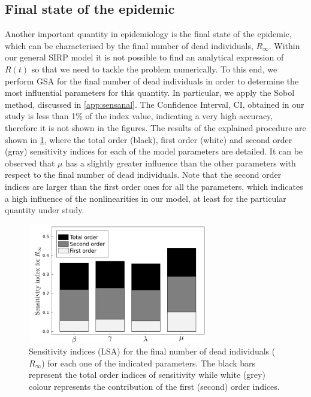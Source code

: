\subsection{Final state of the epidemic}

Another important quantity in epidemiology is the final state of the
epidemic, which can be characterised by the final number of dead individuals,
$R_\infty$. Within our general SIRP model it is not possible to find an
analytical expression of $R(t)$ so that we need to tackle the problem
numerically. To this end, we perform GSA for the final number of dead
individuals in order to determine the most influential parameters for this
quantity. In particular, we apply the Sobol method, discussed in
\cref{app:sensanal}.
The Confidence Interval, CI, obtained in our
study is less than 1\% of the index value, indicating a very high accuracy,
therefore it is not shown in the figures. The results of the explained
procedure are shown in \cref{fig: GSA_R_inf}, where the total order (black),
first order (white) and second order (gray) sensitivity indices for each of the
model parameters are detailed. It can be observed that $\mu$ has a slightly
greater influence than the other parameters with respect to the final number of
dead individuals. Note that the second order indices are larger than the first
order ones for all the parameters, which indicates a high influence of the
nonlinearities in our model, at least for the particular quantity under study.

\begin{figure}[H]
    \centering
    \includegraphics[width=0.7\textwidth]{Figures/GSA_R_inf.png}
    \caption{Sensitivity indices (LSA) for the final number of dead
        individuals ($R_\infty$) for each one of the indicated parameters. The
        black
        bars represent the total order indices of sensitivity while white
        (grey) colour
        represents the contribution of the first (second) order indices.}
    \label{fig: GSA_R_inf}
\end{figure}


